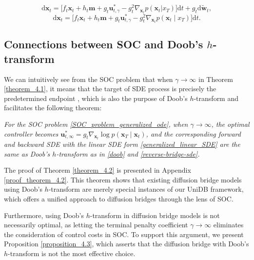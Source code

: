 \begin{equation}\label{ours_reverse_sde}
\mathrm{d} \mathbf{x}_t = \Big[f_t \mathbf{x}_t + h_t \mathbf{m} + g_t  \mathbf{u}_{t, \gamma}^{*} - g^2_t \nabla_{\mathbf{x}_t} p(\mathbf{x}_t | x_T) \Big] \mathrm{d} t+ g_t \mathrm{d} \tilde{\mathbf{w}}_t,
\end{equation}
\begin{equation}\label{ours_reverse_ode}
\mathrm{d} \mathbf{x}_t = \Big[f_t \mathbf{x}_t + h_t \mathbf{m} + g_t  \mathbf{u}_{t, \gamma}^{*} - g^2_t \nabla_{\mathbf{x}_t} p(\mathbf{x}_t \mid x_T) \Big] \mathrm{d}t.
\end{equation}


\subsection{Connections between SOC and Doob's $h$-transform}
We can intuitively see from the SOC problem that when $\gamma \to \infty$ in Theorem \ref{theorem_4.1}, it means that the target of SDE process is precisely the predetermined endpoint \cite{chen2024generativemodelingphasestochastic}, which is also the purpose of Doob's $h$-transform and facilitates the following theorem:
\begin{theorem}\label{theorem_4.2} 
\textit{For the SOC problem \eqref{SOC_problem_generalized_ode}, when $\gamma \to \infty$, the optimal controller becomes $\mathbf{u}^{*}_{t, \infty} = g_t \nabla_{\mathbf{x}_t} \log p(\mathbf{x}_T \mid \mathbf{x}_t)$, and the corresponding forward and backward SDE with the linear SDE form \eqref{generalized_linear_SDE} are the same as Doob's $h$-transform as in \eqref{doob} and \eqref{reverse-bridge-sde}. 
}
\end{theorem}
The proof of Theorem \ref{theorem_4.2} is presented in Appendix \ref{proof_theorem_4.2}. This theorem shows that existing diffusion bridge models using Doob's $h$-transform are merely special instances of our UniDB framework, which offers a unified approach to diffusion bridges through the lens of SOC.

Furthermore, using Doob's $h$-transform in diffusion bridge models is not necessarily optimal, as letting the terminal penalty coefficient $\gamma \to \infty$ eliminates the consideration of control costs in SOC. To support this argument, we present Proposition \ref{proposition_4.3}, which asserts that the diffusion bridge with Doob's $h$-transform is not the most effective choice. 

